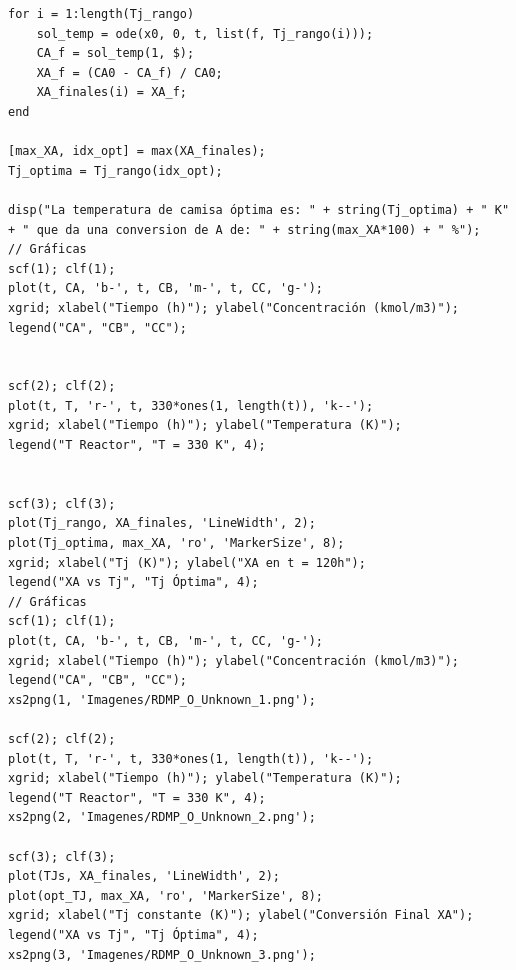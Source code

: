 \begin{verbatim}
for i = 1:length(Tj_rango)
    sol_temp = ode(x0, 0, t, list(f, Tj_rango(i)));
    CA_f = sol_temp(1, $);
    XA_f = (CA0 - CA_f) / CA0;
    XA_finales(i) = XA_f;
end

[max_XA, idx_opt] = max(XA_finales);
Tj_optima = Tj_rango(idx_opt);

disp("La temperatura de camisa óptima es: " + string(Tj_optima) + " K" + " que da una conversion de A de: " + string(max_XA*100) + " %");
// Gráficas
scf(1); clf(1);
plot(t, CA, 'b-', t, CB, 'm-', t, CC, 'g-');
xgrid; xlabel("Tiempo (h)"); ylabel("Concentración (kmol/m3)");
legend("CA", "CB", "CC");


scf(2); clf(2);
plot(t, T, 'r-', t, 330*ones(1, length(t)), 'k--');
xgrid; xlabel("Tiempo (h)"); ylabel("Temperatura (K)");
legend("T Reactor", "T = 330 K", 4);


scf(3); clf(3);
plot(Tj_rango, XA_finales, 'LineWidth', 2);
plot(Tj_optima, max_XA, 'ro', 'MarkerSize', 8);
xgrid; xlabel("Tj (K)"); ylabel("XA en t = 120h");
legend("XA vs Tj", "Tj Óptima", 4);
// Gráficas
scf(1); clf(1);
plot(t, CA, 'b-', t, CB, 'm-', t, CC, 'g-');
xgrid; xlabel("Tiempo (h)"); ylabel("Concentración (kmol/m3)");
legend("CA", "CB", "CC");
xs2png(1, 'Imagenes/RDMP_O_Unknown_1.png');

scf(2); clf(2);
plot(t, T, 'r-', t, 330*ones(1, length(t)), 'k--');
xgrid; xlabel("Tiempo (h)"); ylabel("Temperatura (K)");
legend("T Reactor", "T = 330 K", 4);
xs2png(2, 'Imagenes/RDMP_O_Unknown_2.png');

scf(3); clf(3);
plot(TJs, XA_finales, 'LineWidth', 2);
plot(opt_TJ, max_XA, 'ro', 'MarkerSize', 8);
xgrid; xlabel("Tj constante (K)"); ylabel("Conversión Final XA");
legend("XA vs Tj", "Tj Óptima", 4);
xs2png(3, 'Imagenes/RDMP_O_Unknown_3.png');
\end{verbatim}

